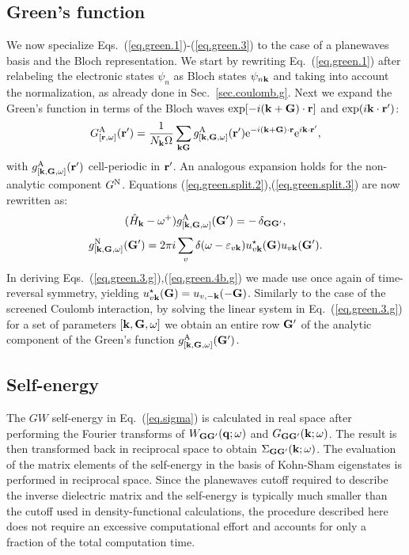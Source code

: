 \documentclass[twocolumn,prb,showpacs,superscriptaddress]{revtex4}
\def\w{\omega}
\def\H{\hat{H}}
\def\E{\varepsilon}
\def\q{{\bf q}}
\def\k{{\bf k}}
\def\G{{\bf G}}
\def\Gp{{\bf G^\prime}}
\def\r{{\bf r}}
\def\rp{{\bf r^\prime}}
\begin{document}
\subsection{Green's function}\label{sec.green.g}

We now specialize Eqs.\ (\ref{eq.green.1})-(\ref{eq.green.3}) to the case
of a planewaves basis and the Bloch representation.
We start by rewriting Eq.\ (\ref{eq.green.1}) after relabeling the electronic states
$\psi_n$ as Bloch states $\psi_{n\k}$ and taking into account the
normalization, as already done in Sec.\ \ref{sec.coulomb.g}.
Next we expand the Green's function in terms
of the Bloch waves ${\rm exp}[-i(\k+\G)\cdot\r]$ and ${\rm exp}(i\k\cdot\rp)$:
  \begin{equation}\label{eq.green.bloch}
  G^{\rm A}_{[\r,\w]} (\rp) = \frac{1}{N_\k\Omega}  \sum_{\k\G} g^{\rm A}_{[\k,\G,\w]}(\rp)
   {\rm e}^{-i(\k+\G)\cdot\r} {\rm e}^{i\k\cdot\rp},
  \end{equation}
with $g^{\rm A}_{[\k,\G,\w]}(\rp)$ cell-periodic in $\rp$. An analogous expansion
holds for the non-analytic component $G^{\rm N}$.
Equations (\ref{eq.green.split.2}),(\ref{eq.green.split.3}) are now rewritten as:
  \begin{equation}\label{eq.green.3.g}
   (\H_\k-\w^+)  g^{\rm A}_{[\k,\G,\w]}(\Gp)  =  -\,\delta_{\G\Gp},
  \end{equation}
  \begin{equation} \label{eq.green.4b.g}
  g^{\rm N}_{[\k,\G,\w]}(\Gp)  =  
  2\pi i \sum_v \delta(\w-\E_{v\k}) u^\star_{v\k}(\G)u_{v\k} (\Gp).
  \end{equation}
In deriving Eqs.\ (\ref{eq.green.3.g}),(\ref{eq.green.4b.g}) we made use once again
of time-reversal symmetry, yielding
$u^\star_{v\k}(\G) = u_{v,-\k}(-\G)$.
Similarly to the case of the screened Coulomb interaction, by solving the
linear system in Eq.\ (\ref{eq.green.3.g}) for a set of parameters $[\k,\G,\w]$ 
we obtain an entire row $\Gp$ of the analytic component of the
Green's function $g^{\rm A}_{[\k,\G,\w]}(\Gp)$.

\subsection{Self-energy}\label{sec.sigma.g}

The $GW$ self-energy in Eq.\ (\ref{eq.sigma}) is calculated in real space
after performing the Fourier transforms of $W_{\G\Gp}(\q;\w)$ and $G_{\G\Gp}(\k;\w)$.
The result is then transformed back in reciprocal space to obtain
$\Sigma_{\G\Gp}(\k;\w)$. The evaluation of the matrix elements of the
self-energy in the basis of Kohn-Sham eigenstates is performed in reciprocal space.
Since the planewaves cutoff required to describe the inverse dielectric
matrix and the self-energy is typically much smaller than the cutoff used
in density-functional calculations,\cite{hl86} the procedure described here 
does not require an excessive computational effort and accounts for only
a fraction of the total computation time.
\end{document}
